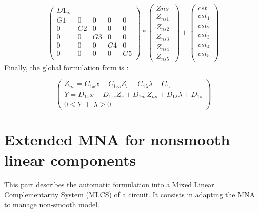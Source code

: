 \[
\left(\begin{array}{ccccc}
  D1_{ns}\\
  \hline
  G1&0&0&0&0\\
  0&G2&0&0&0\\
  0&0&G3&0&0\\
  0&0&0&G4&0\\
  0&0&0&0&G5\\
\end{array}\right)*
\left(\begin{array}{c}
  Zns\\
  \hline
   Z_{ns1} \\
   Z_{ns2}\\
   Z_{ns3}\\
   Z_{ns4}\\
   Z_{ns5}\
\end{array}\right)+
\left(\begin{array}{c}
  cst\\
  \hline
   cst_{1} \\
   cst_{2}\\
   cst_{3}\\
   cst_{4}\\
   cst_{5}\\
\end{array}\right)
\]
Finally, the global formulation form is : 

\[\left(\begin{array}{c}
Z_{ns}= C_{1x}x+C_{1zs}Z_{s}+C_{1\lambda}\lambda +C_{1s}\\
Y=D_{1x}x +D_{1zs}Z_{s}+D_{1ns}Z_{ns}+D_{1\lambda}\lambda+D_{1s}\\
0 \leq Y \, \perp \, \lambda \geq 0
\end{array}\right)\]
\newpage
\section{Extended MNA for nonsmooth linear components}
This part describes the automatic formulation into a Mixed Linear Complementarity System (MLCS) of a circuit. It consists in adapting the MNA to manage non-smooth model.

